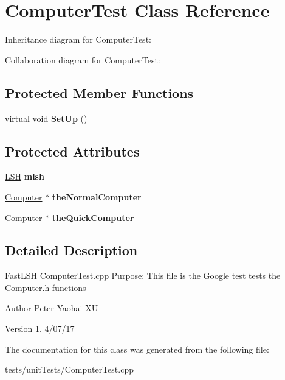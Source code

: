 \hypertarget{classComputerTest}{}\section{Computer\+Test Class Reference}
\label{classComputerTest}


Inheritance diagram for Computer\+Test\+:


Collaboration diagram for Computer\+Test\+:
\subsection*{Protected Member Functions}
\begin{DoxyCompactItemize}
\item 
virtual void {\bfseries Set\+Up} ()\hypertarget{classComputerTest_ad189239df4c8554022786309649c2611}{}\label{classComputerTest_ad189239df4c8554022786309649c2611}

\end{DoxyCompactItemize}
\subsection*{Protected Attributes}
\begin{DoxyCompactItemize}
\item 
\hyperlink{classLSH}{L\+SH} {\bfseries mlsh}\hypertarget{classComputerTest_acd793d84144f316315e5f03783f9a10f}{}\label{classComputerTest_acd793d84144f316315e5f03783f9a10f}

\item 
\hyperlink{classComputer}{Computer} $\ast$ {\bfseries the\+Normal\+Computer}\hypertarget{classComputerTest_a27d9995706dd16239771f62464fea696}{}\label{classComputerTest_a27d9995706dd16239771f62464fea696}

\item 
\hyperlink{classComputer}{Computer} $\ast$ {\bfseries the\+Quick\+Computer}\hypertarget{classComputerTest_aad827af271596f75f5e00df32f035259}{}\label{classComputerTest_aad827af271596f75f5e00df32f035259}

\end{DoxyCompactItemize}


\subsection{Detailed Description}
Fast\+L\+SH Computer\+Test.\+cpp Purpose\+: This file is the Google test tests the \hyperlink{Computer_8h_source}{Computer.\+h} functions

\begin{DoxyAuthor}{Author}
Peter Yaohai XU 
\end{DoxyAuthor}
\begin{DoxyVersion}{Version}
1. 4/07/17 
\end{DoxyVersion}


The documentation for this class was generated from the following file\+:\begin{DoxyCompactItemize}
\item 
tests/unit\+Tests/Computer\+Test.\+cpp\end{DoxyCompactItemize}
